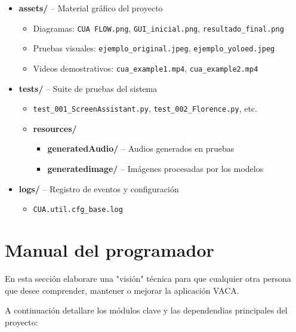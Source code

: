 \begin{itemize}
  \item \textbf{assets/} -- Material gráfico del proyecto
  \begin{itemize}
    \item Diagramas: \texttt{CUA FLOW.png}, \texttt{GUI\_inicial.png}, \texttt{resultado\_final.png}
    \item Pruebas visuales: \texttt{ejemplo\_original.jpeg}, \texttt{ejemplo\_yoloed.jpeg}
    \item Videos demostrativos: \texttt{cua\_example1.mp4}, \texttt{cua\_example2.mp4}
  \end{itemize}

  \item \textbf{tests/} -- Suite de pruebas del sistema
  \begin{itemize}
    \item \texttt{test\_001\_ScreenAssistant.py}, \texttt{test\_002\_Florence.py}, etc.
    \item \textbf{resources/}
    \begin{itemize}
      \item \textbf{generatedAudio/} -- Audios generados en pruebas
      \item \textbf{generatedimage/} -- Imágenes procesadas por los modelos
    \end{itemize}
  \end{itemize}

  \item \textbf{logs/} -- Registro de eventos y configuración
  \begin{itemize}
    \item \texttt{CUA.util.cfg\_base.log}
  \end{itemize}
\end{itemize}


\section{Manual del programador}

En esta sección elaborare una "visión" técnica para que cualquier otra persona que desee comprender, mantener o mejorar la aplicación VACA.

A continuación detallare los módulos clave y las dependendias principales del proyecto:

